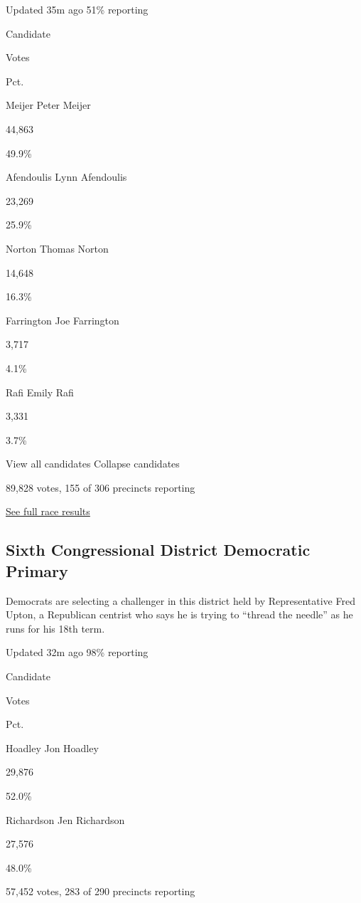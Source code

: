 Updated 35m ago 51\% reporting

Candidate

Votes

Pct.

Meijer Peter Meijer

44,863

49.9\%

Afendoulis Lynn Afendoulis

23,269

25.9\%

Norton Thomas Norton

14,648

16.3\%

Farrington Joe Farrington

3,717

4.1\%

Rafi Emily Rafi

3,331

3.7\%

View all candidates Collapse candidates

89,828 votes, 155 of 306 precincts reporting

\href{https://www.nytimes3xbfgragh.onion/interactive/2020/08/04/us/elections/results-michigan-house-district-3-primary-election.html}{See
full race results}

\hypertarget{sixth-congressional-district-democratic-primary}{%
\subsection{Sixth Congressional District Democratic
Primary}\label{sixth-congressional-district-democratic-primary}}

Democrats are selecting a challenger in this district held by
Representative Fred Upton, a Republican centrist who says he is trying
to ``thread the needle'' as he runs for his 18th term.

Updated 32m ago 98\% reporting

Candidate

Votes

Pct.

Hoadley Jon Hoadley

29,876

52.0\%

Richardson Jen Richardson

27,576

48.0\%

57,452 votes, 283 of 290 precincts reporting


